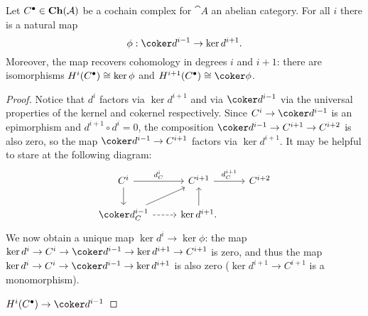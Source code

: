 \begin{prop}\label{prop:magic-map-of-cohomology}
	Let $\cochaincomplex{C} \in \catChainComplex(\cat A)$ be a cochain complex for $\cat A$ an abelian category. For all $i$ there is a natural map \[
    	\phi: \coker d^{i-1} \to \ker d^{i+1}.
    \] Moreover, the map recovers cohomology in degrees $i$ and $i+1$: there are isomorphisms $\cohomology^i(\cochaincomplex{C}) \cong \ker \phi$ and $\cohomology^{i+1}(\cochaincomplex{C}) \cong \coker \phi$. 
\end{prop}
\begin{proof}
	
Notice that $d^i$ factors via $\ker d^{i+1}$ and via $\coker d^{i-1}$ via the universal properties of the kernel and cokernel respectively. Since $C^i \to \coker d^{i-1}$ is an epimorphism and $d^{i+1} \circ d^i = 0$, the composition $\coker d^{i-1} \to C^{i+1} \to C^{i+2}$ is also zero, so the map $\coker d^{i-1} \to C^{i+1}$ factors via $\ker d^{i+1}$. It may be helpful to stare at the following diagram: 
\[\begin{tikzcd}
	{C^i} & {C^{i+1}} & {C^{i+2}} \\
	{\coker d^{i-1}_C} & {\ker d^{i+1}.}
	\arrow["{d^i_C}", from=1-1, to=1-2]
	\arrow[from=1-1, to=2-1]
	\arrow["{d^{i+1}_C}", from=1-2, to=1-3]
	\arrow[from=2-1, to=1-2]
	\arrow[dashed, from=2-1, to=2-2]
	\arrow[from=2-2, to=1-2]
\end{tikzcd}\]We now obtain a unique map $\ker d^i \to \ker \phi$: the map $\ker d^i \to C^i \to \coker d^{i-1} \to \ker d^{i+1} \to C^{i+1}$ is zero, and thus the map $\ker d^i \to C^i \to \coker d^{i-1} \to \ker d^{i+1}$ is also zero ($\ker d^{i+1} \to C^{i+1}$ is a monomorphism).

$\cohomology^i(\cochaincomplex{C}) \to \coker d^{i-1}$ 
\end{proof}


